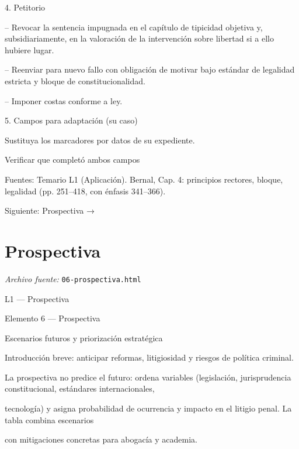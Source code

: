 \documentclass[11pt,a4paper]{article}
\begin{document}
      4. Petitorio\par



-- Revocar la sentencia impugnada en el capítulo de tipicidad objetiva y, subsidiariamente, en la valoración de la intervención sobre libertad si a ello hubiere lugar.\par


-- Reenviar para nuevo fallo con obligación de motivar bajo estándar de legalidad estricta y bloque de constitucionalidad.\par


-- Imponer costas conforme a ley.\par





      5. Campos para adaptación (su caso)\par

      Sustituya los marcadores por datos de su expediente.\par



      Verificar que completó ambos campos\par





      Fuentes: Temario L1 (Aplicación). Bernal, Cap. 4: principios rectores, bloque, legalidad (pp. 251–418, con énfasis 341–366).\par


    Siguiente: Prospectiva →\par

\section{Prospectiva}
\noindent\textit{Archivo fuente:} \texttt{06-prospectiva.html}

L1 — Prospectiva\par





    Elemento 6 — Prospectiva\par
    Escenarios futuros y priorización estratégica\par

    Introducción breve: anticipar reformas, litigiosidad y riesgos de política criminal.\par


      La prospectiva no predice el futuro: ordena variables (legislación, jurisprudencia constitucional, estándares internacionales,\par
      tecnología) y asigna probabilidad de ocurrencia y impacto en el litigio penal. La tabla combina escenarios\par
      con mitigaciones concretas para abogacía y academia.\par
\end{document}
